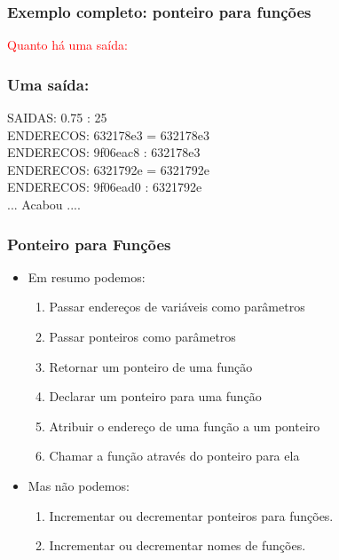 \begin{frame}[allowframebreaks=0.9, c]

\frametitle{Exemplo completo: ponteiro para funções}



\textcolor{red}{Quanto há uma saída:}
\end{frame}

\begin{frame}[fragile, c]

\frametitle{Uma saída:}
\begin{block}{}
\begin{small}
SAIDAS:   0.75 : 25\\
ENDERECOS: 632178e3 = 632178e3\\ 
ENDERECOS: 9f06eac8 : 632178e3\\ 
ENDERECOS: 6321792e = 6321792e\\ 
ENDERECOS: 9f06ead0 : 6321792e\\ 
 ... Acabou ....\\
\end{small}
\end{block}
\end{frame}







\begin{frame}[fragile,c]
\frametitle{Ponteiro para Funções}
\begin{itemize}
  \item Em resumo podemos:  
    \begin{enumerate}
      \item Passar endereços de variáveis como parâmetros
      \item Passar ponteiros como parâmetros
      \item Retornar um ponteiro de uma função

      \item Declarar um ponteiro para uma função

      \item Atribuir o endereço de uma função a um ponteiro

      \item Chamar a função através do ponteiro para ela

    \end{enumerate}

  \item Mas não podemos:  

    \begin{enumerate}
      \item Incrementar ou decrementar ponteiros para funções.
      \item Incrementar ou decrementar nomes de funções.
    \end{enumerate} 

\end{itemize}

\end{frame}

